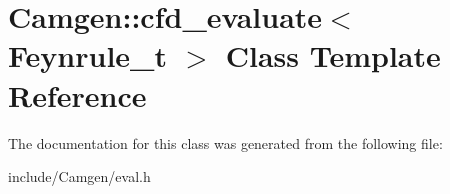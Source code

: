 \hypertarget{a00044}{\section{Camgen\-:\-:cfd\-\_\-evaluate$<$ Feynrule\-\_\-t $>$ Class Template Reference}
\label{a00044}
}


The documentation for this class was generated from the following file\-:\begin{DoxyCompactItemize}
\item 
include/\-Camgen/eval.\-h\end{DoxyCompactItemize}
